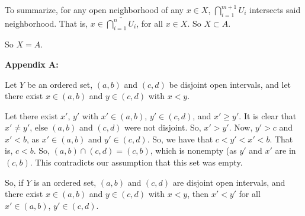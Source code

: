 \documentclass[a4paper,12pt]{article}
\begin{document}
To summarize, for any open neighborhood of any $x \in X$, $\bigcap\limits_{i=1}^{m+1} U_i$ intersects said neighborhood. That is, $x \in \overline{\bigcap\limits_{i=1}^n U_i}$, for all $x \in X$. So $X \subset A$.

So $X = A$. 

\shunt

{\bf Appendix A:}

Let $Y$ be an ordered set, $(a,b)$ and $(c,d)$ be disjoint open intervals, and let there exist $x \in (a,b)$ and $y \in (c,d)$ with $x<y$.

Let there exist $x'$, $y'$ with $x' \in (a,b)$, $y' \in (c,d)$, and $x' \geq y'$. It is clear that $x' \neq y'$, else $(a,b)$ and $(c,d)$ were not disjoint. So, $x' > y'$. Now, $y' > c$ and $x' < b$, as $x' \in (a,b)$ and $y' \in (c,d)$. So, we have that $c< y' < x' < b$. That is, $c < b$. So, $(a,b) \cap (c,d) = (c,b)$, which is nonempty (as $y'$ and $x'$ are in $(c,b)$. This contradicts our assumption that this set was empty.

So, if $Y$ is an ordered set,  $(a,b)$ and $(c,d)$ are disjoint open intervals, and there exist $x \in (a,b)$ and $y \in (c,d)$ with $x<y$, then $x'<y'$ for all $x' \in (a,b)$, $y' \in (c,d)$.

\shunt
\end{document}
